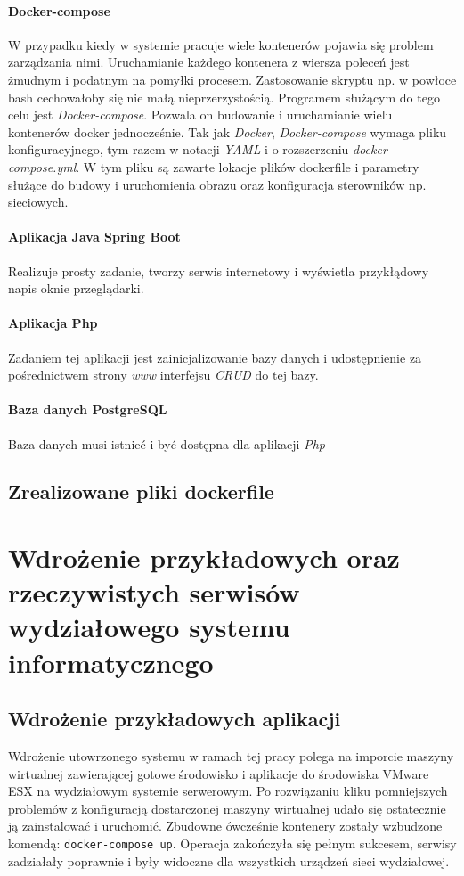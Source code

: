 \documentclass[polish, a4paper, 12pt, oneside]{book}
\begin{document}
\subsubsection{Docker-compose}
W przypadku kiedy w systemie pracuje wiele kontenerów pojawia się problem zarządzania nimi. Uruchamianie każdego kontenera z wiersza poleceń jest żmudnym i podatnym na pomyłki procesem. Zastosowanie skryptu np. w powłoce bash cechowałoby się nie małą nieprzerzystością. Programem służącym do tego celu jest \textit{Docker-compose}. Pozwala on budowanie i uruchamianie wielu kontenerów docker jednocześnie. Tak jak \textit{Docker}\cite{docker}, \textit{Docker-compose}\cite{dockercompose} wymaga pliku konfiguracyjnego, tym razem w notacji \textit{YAML} i o rozszerzeniu \textit{docker-compose.yml}. W tym pliku są zawarte lokacje plików dockerfile i parametry służące do budowy i uruchomienia obrazu oraz konfiguracja sterowników np. sieciowych. 
\subsubsection{Aplikacja Java Spring Boot}
Realizuje prosty zadanie, tworzy serwis internetowy i wyświetla przykłądowy napis oknie przeglądarki.
\subsubsection{Aplikacja Php}
Zadaniem tej aplikacji jest zainicjalizowanie bazy danych i udostępnienie za pośrednictwem strony \textit{www} interfejsu \textit{CRUD} do tej bazy.
\subsubsection{Baza danych PostgreSQL}
Baza danych musi istnieć i być dostępna dla aplikacji \textit{Php}
\section{Zrealizowane pliki dockerfile}

\chapter{Wdrożenie przykładowych oraz rzeczywistych serwisów wydziałowego systemu informatycznego}
\section{Wdrożenie przykładowych aplikacji}
Wdrożenie utowrzonego systemu w ramach tej pracy polega na imporcie maszyny wirtualnej zawierającej gotowe środowisko i aplikacje do środowiska VMware ESX na wydziałowym systemie serwerowym. Po rozwiązaniu kliku pomniejszych problemów z konfiguracją dostarczonej maszyny wirtualnej udało się ostatecznie ją zainstalować i uruchomić. Zbudowne ówcześnie kontenery zostały wzbudzone komendą: \texttt{docker-compose up}. Operacja zakończyła się pełnym sukcesem, serwisy zadziałały poprawnie i były widoczne dla wszystkich urządzeń sieci wydziałowej.
\end{document}
